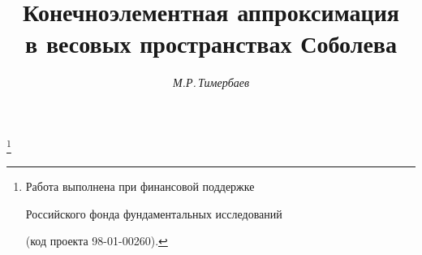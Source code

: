 









\newcommand{\diam}{\operatorname{diam}}


\newcommand{\dist}{\operatorname{dist}}


\newcommand{\mes}{\operatorname{mes}}


\newcommand{\card}{\operatorname{card}}


\newcommand{\Int}{\operatorname{int}}


\newcommand{\tts}[1]{}


\renewcommand{\baselinestretch}{0.98}







\setcounter{page}{76}















\author{\it М.Р.\,Тимербаев}




\title{Конечноэлементная аппроксимация\\


в весовых пространствах Соболева}


\thanks{Работа выполнена при финансовой поддержке 


Российского фонда фундаментальных исследований 


(код проекта 98-01-00260).}





